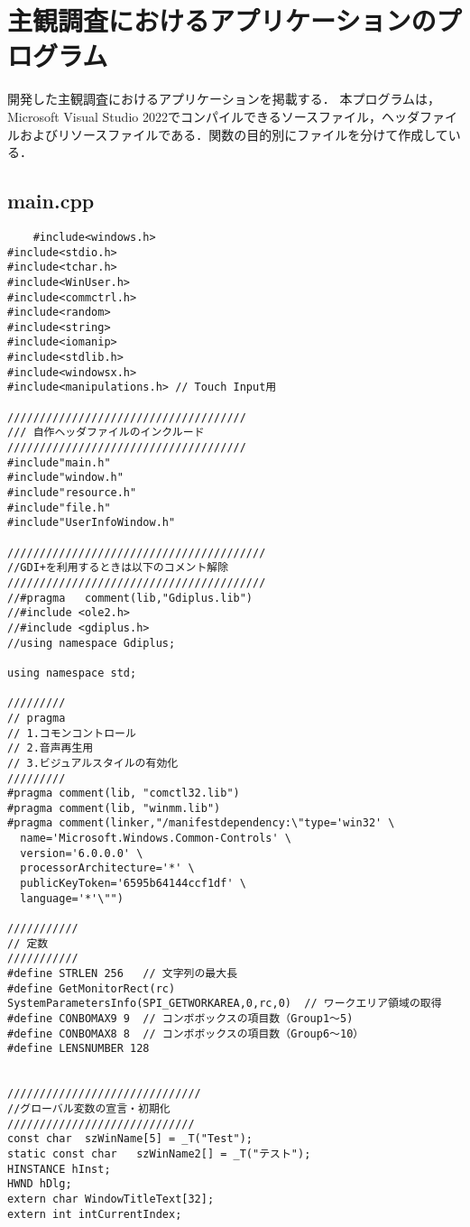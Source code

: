 \chapter{主観調査におけるアプリケーションのプログラム}
開発した主観調査におけるアプリケーションを掲載する．
本プログラムは，Microsoft Visual Studio 2022でコンパイルできるソースファイル，ヘッダファイルおよびリソースファイルである．関数の目的別にファイルを分けて作成している．

\section{main.cpp}
\begin{verbatim}
	#include<windows.h>
#include<stdio.h>
#include<tchar.h>
#include<WinUser.h>
#include<commctrl.h> 
#include<random>
#include<string>
#include<iomanip>
#include<stdlib.h>
#include<windowsx.h>
#include<manipulations.h> // Touch Input用

/////////////////////////////////////
/// 自作ヘッダファイルのインクルード
/////////////////////////////////////
#include"main.h"
#include"window.h"
#include"resource.h"
#include"file.h"
#include"UserInfoWindow.h"

////////////////////////////////////////
//GDI+を利用するときは以下のコメント解除
////////////////////////////////////////
//#pragma	comment(lib,"Gdiplus.lib")
//#include <ole2.h>
//#include <gdiplus.h>
//using namespace Gdiplus;

using namespace std;

/////////
// pragma
// 1.コモンコントロール
// 2.音声再生用
// 3.ビジュアルスタイルの有効化
/////////
#pragma comment(lib, "comctl32.lib")
#pragma comment(lib, "winmm.lib")
#pragma comment(linker,"/manifestdependency:\"type='win32' \
  name='Microsoft.Windows.Common-Controls' \
  version='6.0.0.0' \
  processorArchitecture='*' \
  publicKeyToken='6595b64144ccf1df' \
  language='*'\"") 

///////////
// 定数
///////////
#define STRLEN 256   // 文字列の最大長
#define GetMonitorRect(rc)  SystemParametersInfo(SPI_GETWORKAREA,0,rc,0)  // ワークエリア領域の取得
#define CONBOMAX9 9  // コンボボックスの項目数（Group1～5)
#define CONBOMAX8 8  // コンボボックスの項目数（Group6～10）
#define LENSNUMBER 128


//////////////////////////////
//グローバル変数の宣言・初期化
/////////////////////////////
const char	szWinName[5] = _T("Test");
static const char   szWinName2[] = _T("テスト");
HINSTANCE hInst;
HWND hDlg;
extern char WindowTitleText[32];
extern int intCurrentIndex;


\end{verbatim}
